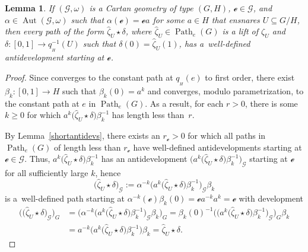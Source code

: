 \documentclass[pdftex]{sigma}
\numberwithin{equation}{section}
\newtheorem{Lemma}[Theorem]{Lemma}
\theoremstyle{definition}
\DeclareMathOperator{\Aut}{\mathrm{Aut}}
\DeclareMathOperator{\Path}{Path}
\begin{document}
\begin{Lemma}\label{snarelemma} If $(\mathscr{G},\omega)$ is a Cartan geometry of type $(G,H)$, $\mathscr{e}\in\mathscr{G}$, and $\alpha\in\Aut(\mathscr{G},\omega)$ such that $\alpha(\mathscr{e})=\mathscr{e}a$ for some $a\in H$ that ensnares $U\subseteq G/H$, then every path of the form $\hat{\zeta}_U\star\delta$, where $\hat{\zeta}_U\in\Path_e(G)$ is a lift of $\zeta_U$ and $\delta\colon [0,1]\to q_{{}_H}^{-1}(U)$ such that $\delta(0)=\hat{\zeta}_U(1)$, has a~well-defined antidevelopment  starting at $\mathscr{e}$.\end{Lemma}
\begin{proof}Since  converges to the constant path at $q_{{}_H}(e)$ to first order, there exist $\beta_k\colon [0,1]\to H$ such that $\beta_k(0)=a^k$ and  converges, modulo parametrization, to the constant path at $e$ in $\Path_e(G)$. As a result, for each $r>0$, there is some $k\geq 0$ for which $a^k\bigl(\hat{\zeta}_U\star\delta\bigr)\beta_k^{-1}$ has length less than~$r$.

By Lemma~\ref{shortantidevs}, there exists an $r_\mathscr{e}>0$ for which all paths in $\Path_e(G)$ of length less than $r_\mathscr{e}$ have well-defined antidevelopments starting at $\mathscr{e}\in\mathscr{G}$. Thus, $a^k\bigl(\hat{\zeta}_U\star\delta\bigr)\beta_k^{-1}$ has an antidevelopment $\bigl(a^k\bigl(\hat{\zeta}_U\star\delta\bigr)\beta_k^{-1}\bigr)_\mathscr{G}$ starting at $\mathscr{e}$ for all sufficiently large $k$, hence \[\bigl(\hat{\zeta}_U\star\delta\bigr)_\mathscr{G}:= \alpha^{-k}\bigl(a^k\bigl(\hat{\zeta}_U\star\delta\bigr)\beta_k^{-1}\bigr)_\mathscr{G}\beta_k\] is a~well-defined path starting at $\alpha^{-k}(\mathscr{e})\beta_k(0)=\mathscr{e}a^{-k}a^k=\mathscr{e}$ with development \begin{align*}\bigl(\bigl(\hat{\zeta}_U\star\delta\bigr)_\mathscr{G}\bigr)_G & =\bigl(\alpha^{-k}\bigl(a^k\bigl(\hat{\zeta}_U\star\delta\bigr)\beta_k^{-1}\bigr)_\mathscr{G}\beta_k\bigr)_G
   =\beta_k(0)^{-1}\bigl(\bigl(a^k\bigl(\hat{\zeta}_U\star\delta\bigr)\beta_k^{-1}\bigr)_\mathscr{G}\bigr)_G\beta_k \\
 & =a^{-k}\bigl(a^k\bigl(\hat{\zeta}_U\star\delta\bigr)\beta_k^{-1}\bigr)\beta_k   =\hat{\zeta}_U\star\delta.\tag*{\qed}
 \end{align*}\renewcommand{\qed}{}
 \end{proof}
\end{document}
